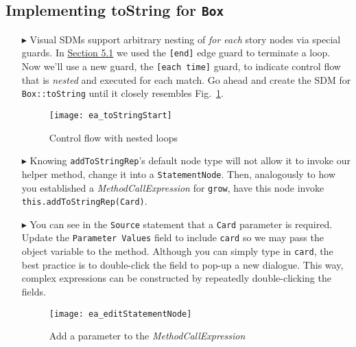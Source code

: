 \newpage
\hypertarget{stringRep vis}{}
\subsection{Implementing toString for \texttt{Box}}
\visHeader

\begin{itemize}

\item[$\blacktriangleright$] Visual SDMs support arbitrary nesting of \emph{for each} story nodes via special guards. In \hyperlink{emptyPartition vis}{Section
5.1} we used the \texttt{[end]} edge guard to terminate a loop. Now we'll use a new guard, the \texttt{[each time]} guard, to indicate control flow that is \emph{nested} and
executed for each match. Go ahead and create the SDM for \texttt{Box::toString} until it closely resembles Fig.~\ref{fig:sdm_tostring_1}. 

\begin{figure}[htbp]
\begin{center}
  \texttt{[image: ea\_toStringStart]}
  \caption{Control flow with nested loops} 
  \label{fig:sdm_tostring_1}
\end{center}
\end{figure}

\clearpage

\item[$\blacktriangleright$] Knowing \texttt{addToStringRep}'s default node type will not allow it to invoke our helper method, change it
into a \texttt{StatementNode}. Then, analogously to how you established a \emph{MethodCallExpression} for \texttt{grow}, have this node invoke
\texttt{this.addToStringRep(Card)}. 

\vspace{0.5cm}

\item[$\blacktriangleright$] You can see in the \texttt{Source} statement that a \texttt{Card} parameter is required. Update the \texttt{Parameter Values}
field to include \texttt{card} so we may pass the object variable to the method. Although you can simply type in \texttt{card}, the best practice is to
double-click the field to pop-up a new dialogue. This way, complex expressions can be constructed by repeatedly double-clicking the fields.

\vspace{0.5cm}

\begin{figure}[htbp]
\begin{center}
  \texttt{[image: ea\_editStatementNode]}
  \caption{Add a parameter to the \emph{MethodCallExpression}}
  \label{fig:editStatement}
\end{center}
\end{figure}


\end{itemize}
